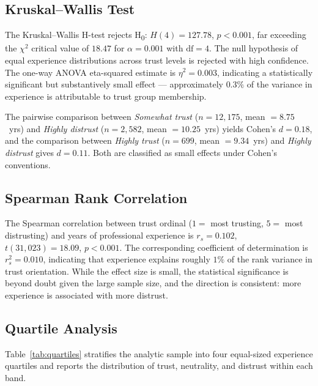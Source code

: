 \documentclass[11pt,a4paper]{article}
\begin{document}
\subsection{Kruskal--Wallis Test}

The Kruskal--Wallis H-test rejects H\textsubscript{0}: $H(4) = 127.78$, $p < 0.001$,
far exceeding the $\chi^2$ critical value of $18.47$ for $\alpha = 0.001$ with
$\text{df} = 4$. The null hypothesis of equal experience distributions across trust
levels is rejected with high confidence. The one-way ANOVA eta-squared estimate is
$\eta^2 = 0.003$, indicating a statistically significant but substantively small effect
--- approximately $0.3\%$ of the variance in experience is attributable to trust group
membership.

The pairwise comparison between \emph{Somewhat trust} ($n = 12{,}175$, mean $= 8.75$~yrs)
and \emph{Highly distrust} ($n = 2{,}582$, mean $= 10.25$~yrs) yields Cohen's $d = 0.18$,
and the comparison between \emph{Highly trust} ($n = 699$, mean $= 9.34$~yrs) and
\emph{Highly distrust} gives $d = 0.11$. Both are classified as small effects under
Cohen's conventions.

\subsection{Spearman Rank Correlation}
\label{sec:corr}

The Spearman correlation between trust ordinal ($1 =$ most trusting, $5 =$ most
distrusting) and years of professional experience is $r_s = 0.102$,
$t(31{,}023) = 18.09$, $p < 0.001$. The corresponding coefficient of determination
is $r_s^2 = 0.010$, indicating that experience explains roughly $1\%$ of the rank
variance in trust orientation. While the effect size is small, the statistical
significance is beyond doubt given the large sample size, and the direction is
consistent: more experience is associated with more distrust.

\subsection{Quartile Analysis}

Table~\ref{tab:quartiles} stratifies the analytic sample into four equal-sized
experience quartiles and reports the distribution of trust, neutrality, and distrust
within each band.
\end{document}
